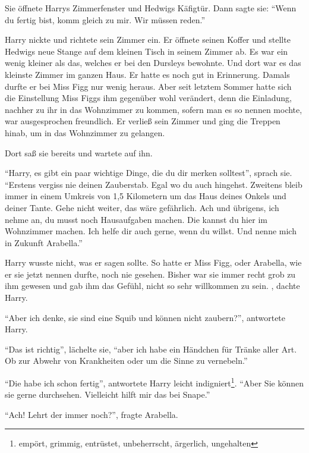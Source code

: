 Sie öffnete Harrys Zimmerfenster und Hedwigs Käfigtür. Dann sagte sie: \enquote{Wenn du fertig bist, komm gleich zu mir. Wir müssen reden.}

Harry nickte und richtete sein Zimmer ein. Er öffnete seinen Koffer und stellte Hedwigs neue Stange auf dem kleinen Tisch in seinem Zimmer ab. Es war ein wenig kleiner als das, welches er bei den Dursleys bewohnte. Und dort war es das kleinste Zimmer im ganzen Haus. Er hatte es noch gut in Erinnerung. Damals durfte er bei Miss Figg nur wenig heraus. Aber seit letztem Sommer hatte sich die Einstellung Miss Figgs ihm gegenüber wohl verändert, denn die Einladung, nachher zu ihr in das Wohnzimmer zu kommen, sofern man es so nennen mochte, war ausgesprochen freundlich. Er verließ sein Zimmer und ging die Treppen hinab, um in das Wohnzimmer zu gelangen.

Dort saß sie bereits und wartete auf ihn.

\enquote{Harry, \gst es gibt ein paar wichtige Dinge, die du dir merken solltest}, sprach sie. \enquote{Erstens \gst vergiss nie deinen Zauberstab. Egal wo du auch hingehst. Zweitens \gst bleib immer in einem Umkreis von 1,5 Kilometern um das Haus deines Onkels und deiner Tante. Gehe nicht weiter, das wäre gefährlich. \gst Ach und übrigens, ich nehme an, du musst noch Hausaufgaben machen. Die kannst du hier im Wohnzimmer machen. Ich helfe dir auch gerne, wenn du willst. Und nenne mich in Zukunft Arabella.}

Harry wusste nicht, was er sagen sollte. So hatte er Miss Figg, oder Arabella, wie er sie jetzt nennen durfte, noch nie gesehen. Bisher war sie immer recht grob zu ihm gewesen und gab ihm das Gefühl, nicht so sehr willkommen zu sein. , dachte Harry.

\enquote{Aber ich denke, sie sind eine Squib und können nicht zaubern?}, antwortete Harry.

\enquote{Das ist richtig}, lächelte sie, \enquote{aber ich habe ein Händchen für Tränke aller Art. Ob zur Abwehr von Krankheiten oder um die Sinne zu vernebeln.}

\enquote{Die habe ich schon fertig}, antwortete Harry leicht indigniert\footnote{empört, grimmig, entrüstet, unbeherrscht, ärgerlich, ungehalten}. \enquote{Aber Sie können sie gerne durchsehen. Vielleicht hilft mir das bei Snape.}

\enquote{Ach! Lehrt der immer noch?}, fragte Arabella.

